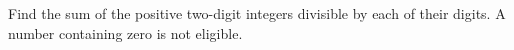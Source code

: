 Find the sum of the positive two-digit integers divisible by each of their digits. A number containing zero is not eligible.
